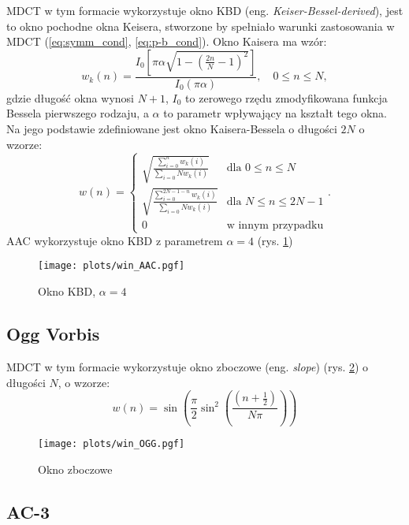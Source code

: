 \documentclass[pl,12pt]{aghdpl}
\let\Oldsubsection\subsection%
\renewcommand{\subsection}{\FloatBarrier\Oldsubsection}
\begin{document}
MDCT w tym formacie wykorzystuje okno KBD (eng.
\textit{Keiser-Bessel-derived}), jest to okno pochodne okna Keisera, stworzone
by spełniało warunki zastosowania w MDCT (\ref{eq:symm_cond},
\ref{eq:p-b_cond}). Okno Kaisera ma wzór:
\begin{equation}\label{eq:kaiser_win}
  w_k(n) = \frac{I_0\left[\pi\alpha\sqrt{1-\left(\frac{2n}{N}-1\right)^2}\right]}
  {I_0(\pi\alpha)},\quad 0 \leq n \leq N,
\end{equation}
gdzie długość okna wynosi $N+1$, $I_0$ to zerowego rzędu zmodyfikowana funkcja
Bessela pierwszego rodzaju, a $\alpha$ to parametr wpływający na kształt tego
okna. Na jego podstawie zdefiniowane jest okno Kaisera-Bessela o długości $2N$
o wzorze:
\begin{equation}\label{eq:kbd_win}
  w(n) = \begin{cases}
    \sqrt{\frac{\sum_{i=0}^{n}w_k(i)}{\sum_{i=0}{N}w_k(i)}} & \text{dla }0 \leq n \leq N \\
    \sqrt{\frac{\sum_{i=0}^{2N-1-n}w_k(i)}{\sum_{i=0}{N}w_k(i)}} & \text{dla }N \leq n \leq 2N-1 \\
    0 & \text{w innym przypadku}
  \end{cases}.
\end{equation}
AAC wykorzystuje okno KBD z parametrem $\alpha = 4$ (rys. \ref{fig:win_AAC})

\begin{figure}[!tbh]
  \centering
  \texttt{[image: plots/win\_AAC.pgf]}
  \caption{Okno KBD, $\alpha = 4$}
  \label{fig:win_AAC}
\end{figure}

\subsection{Ogg Vorbis}

MDCT w tym formacie wykorzystuje okno zboczowe (eng. \textit{slope}) (rys.
\ref{fig:win_OGG}) o długości $N$, o wzorze:
\begin{equation}\label{eq:slope_win}
  w(n) = \sin\left(\frac{\pi}{2}\sin^2\left(\frac{\left(n +
  \frac{1}{2}\right)}{N\pi}\right)\right)
\end{equation}
\begin{figure}[!tbh]
  \centering
  \texttt{[image: plots/win\_OGG.pgf]}
  \caption{Okno zboczowe}
  \label{fig:win_OGG}
\end{figure}

\subsection{AC-3}
\end{document}
